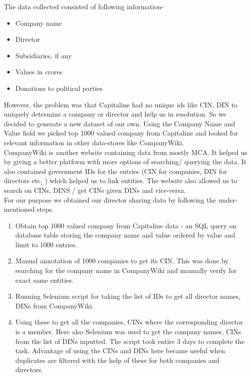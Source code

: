 
The data collected consisted of following information-
\begin{itemize}
    \item Company name
    \item Director
    \item Subsidiaries, if any
    \item Values in crores
    \item Donations to political parties
\end{itemize}

However, the problem was that Capitaline had no unique ids like CIN, DIN to uniquely determine a company or director and help us in resolution. So we decided to generate a new dataset of our own. Using the Company Name and Value field we picked top 1000 valued company from Capitaline and looked for relevant information in other data-stores like CompanyWiki. \\

CompanyWiki is another website containing data from mostly MCA. It helped us by giving a better platform with more options of searching/ querying the data. It also contained government IDs for the entries (CIN for companies, DIN for directors etc. ) which helped us to link entities. The website also allowed us to search on CINs, DINS  / get CINs given DINs and vice-versa.\\

For our purpose we obtained our director sharing data by following the under-mentioned steps.

\begin{enumerate}
    \item Obtain top 1000 valued company from Capitaline data - an SQL query on database table storing the company name and value ordered by value and limit to 1000 entries.
    
    \item Manual annotation of 1000 companies to get its CIN. This was done by searching for the company name in CompanyWiki and manually verify for exact same entities.

    \item Running Selenium script for taking the list of IDs to get all director names, DINs from CompanyWiki.
    
    \item Using these to get all the companies, CINs where the corresponding director is a member. Here also Selenium was used to get the company names, CINs from the list of DINs inputted. The script took entire 3 days to complete the task. Advantage of using the CINs and DINs here became useful when duplicates are filtered with the help of these for both companies and directors.

\end{enumerate}

